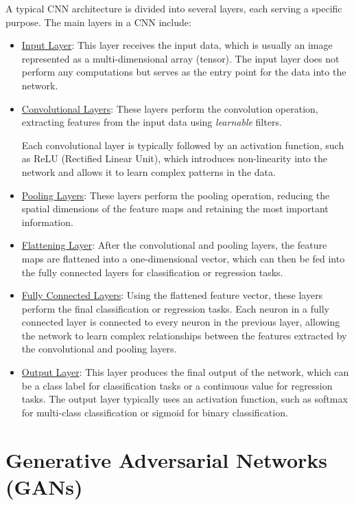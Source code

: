 A typical CNN architecture is divided into several layers, each serving a specific purpose. The main layers in a CNN include:
\begin{itemize}
    \item \ul{Input Layer}: This layer receives the input data, which is usually an image represented as a multi-dimensional array (tensor). The input layer does not perform any computations but serves as the entry point for the data into the network.
    \item \ul{Convolutional Layers}: These layers perform the convolution operation, extracting features from the input data using \emph{learnable} filters.
    
    Each convolutional layer is typically followed by an activation function, such as ReLU (Rectified Linear Unit), which introduces non-linearity into the network and allows it to learn complex patterns in the data.

    \item \ul{Pooling Layers}: These layers perform the pooling operation, reducing the spatial dimensions of the feature maps and retaining the most important information.
    
    \item \ul{Flattening Layer}: After the convolutional and pooling layers, the feature maps are flattened into a one-dimensional vector, which can then be fed into the fully connected layers for classification or regression tasks.
    
    \item \ul{Fully Connected Layers}: Using the flattened feature vector, these layers perform the final classification or regression tasks. Each neuron in a fully connected layer is connected to every neuron in the previous layer, allowing the network to learn complex relationships between the features extracted by the convolutional and pooling layers.
    
    \item \ul{Output Layer}: This layer produces the final output of the network, which can be a class label for classification tasks or a continuous value for regression tasks. The output layer typically uses an activation function, such as softmax for multi-class classification or sigmoid for binary classification.
\end{itemize}


\section{Generative Adversarial Networks (GANs)}

